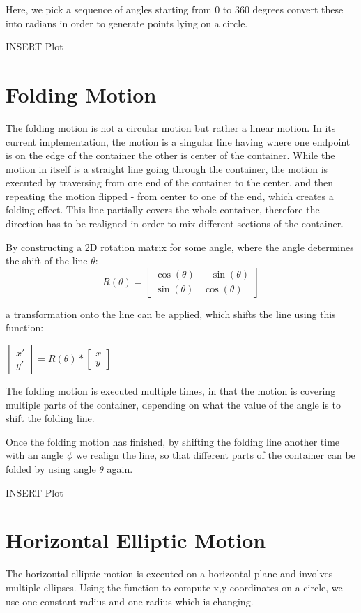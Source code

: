 Here, we pick a sequence of angles starting from
0 to 360 degrees convert these into radians in order to generate points lying on a circle.

INSERT Plot

\section{Folding Motion}
The folding motion is not a circular motion but rather a linear motion. In its current implementation, the motion is a singular line having where one endpoint is on the edge of the container
the other is center of the container. While the motion in itself is a straight line going through the container, the motion is executed by traversing from one end of the container to the center,
and then repeating the motion flipped - from center to one of the end, which creates a folding effect.
This line partially covers the whole container, therefore the direction has to be realigned in order to mix different sections of the container.

By constructing a 2D rotation matrix for some angle, where the angle determines the shift of the line $\theta$:
\[R(\theta) = \begin{bmatrix}
    \cos(\theta) & -\sin(\theta) \\
    \sin(\theta) & \cos(\theta)
     \end{bmatrix}
 \] 

a transformation onto the line can be applied, which shifts the line using this function: 

$\begin{bmatrix} x' \\ y' \end{bmatrix} = R(\theta) * \begin{bmatrix} x \\ y \end{bmatrix}$

The folding motion is executed multiple times, in that the motion is covering multiple parts of the container, depending on what 
the value of the angle is to shift the folding line. 

Once the folding motion has finished, by shifting the folding line another time with an angle $\phi$
we realign the line, so that different parts of the container can be folded by using angle $\theta$ again.

INSERT Plot

\section{Horizontal Elliptic Motion}
The horizontal elliptic motion is executed on a horizontal plane and involves multiple ellipses.
Using the function to compute x,y coordinates on a circle, we use one constant radius and one radius which is changing. 

